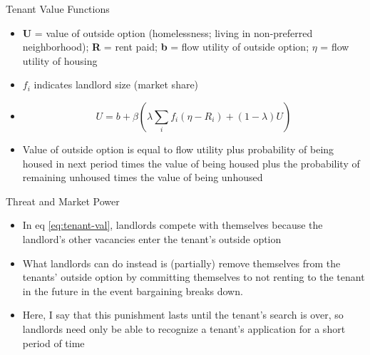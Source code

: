\documentclass[10pt, xcolor=dvipsnames]{beamer}
\begin{document}
\begin{frame}{Tenant Value Functions}
\begin{itemize}
    \item \textbf{U} = value of outside option (homelessness; living in non-preferred neighborhood); \textbf{R} = rent paid; \textbf{b} = flow utility of outside option; \textbf{$\eta$} = flow utility of housing
    \item \textbf{$f_i$} indicates landlord size (market share)
    \item \begin{equation}
        U = b + \beta\left(\lambda \sum_{i} f_i(\eta - R_i) + (1-\lambda)U\right)\label{eq:tenant-val}
    \end{equation}
    \item Value of outside option is equal to flow utility plus probability of being housed in next period times the value of being housed plus the probability of remaining unhoused times the value of being unhoused
\end{itemize}
\end{frame}

\begin{frame}{Threat and Market Power}
    \begin{itemize}
    \item In eq \ref{eq:tenant-val}, landlords compete with themselves because the landlord's other vacancies enter the tenant's outside option
    \item What landlords can do instead is (partially) remove themselves from the tenants' outside option by committing themselves to not renting to the tenant in the future in the event bargaining breaks down.
    \item Here, I say that this punishment lasts until the tenant's search is over, so landlords need only be able to recognize a tenant's application for a short period of time
    \end{itemize}
\end{frame}
\end{document}
